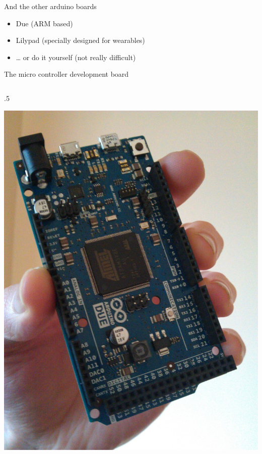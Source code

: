 \begin{frame}{And the other arduino boards}
	\begin{itemize}
		\item Due (ARM based)
		\item Lilypad (specially designed for wearables)
		\item … or do it yourself (not really difficult)
	\end{itemize}
\end{frame}

\begin{frame}{The micro controller development board}
	\begin{columns} [c,onlytextwidth]
		\begin{column} [c] {.5\textwidth}
			\begin{center}
				\includegraphics [width=.9\textwidth,keepaspectratio]{img/due}
			\end{center}

\end{column}
\end{columns}
\end{frame}
